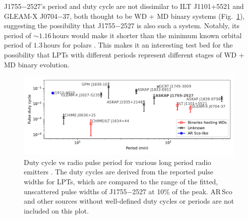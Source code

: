 \documentclass[fleqn,usenatbib]{mnras}
\newcommand{\src}{J1755$-$2527}
\newcommand{\Fig}{Fig.}
\begin{document}
\src{}'s period and duty cycle are not dissimilar to ILT J1101+5521 and GLEAM-X J0704$-$37, both thought to be WD + MD binary systems (\Fig~\ref{fig:lpt_comparison}), suggesting the possibility that \src{} is also such a system.
Notably, its period of ${\sim}1.16\,$hours would make it shorter than the minimum known orbital period of $1.3\,$hours for polars \citep{2009MNRAS.397.2170G,schwope2025polarcatcatalogpolarslowaccretion}.
This makes it an interesting test bed for the possibility that LPTs with different periods represent different stages of WD + MD binary evolution.
\begin{figure}
    \centering
    \includegraphics[width=0.98\linewidth]{lpt_comparison.pdf}
    \caption{Duty cycle vs radio pulse period for various long period radio emitters \citep{deRuiter2025,2022Natur.601..526H,2023Natur.619..487H,2024NatAs...8.1159C,2005Natur.434...50H,deRuiter2025,Lee2025,2024arXiv241116606W}. The duty cycles are derived from the reported pulse widths for LPTs, which are compared to the range of the fitted, unscattered pulse widths of \src{} at 10\% of the peak. AR\,Sco \citep{2016Natur.537..374M,2018A&A...611A..66S} and other sources without well-defined duty cycles or periods \citep[e.g.][and references therein]{2021ApJ...920...45W} are not included on this plot.}
    \label{fig:lpt_comparison}
\end{figure}
\end{document}
